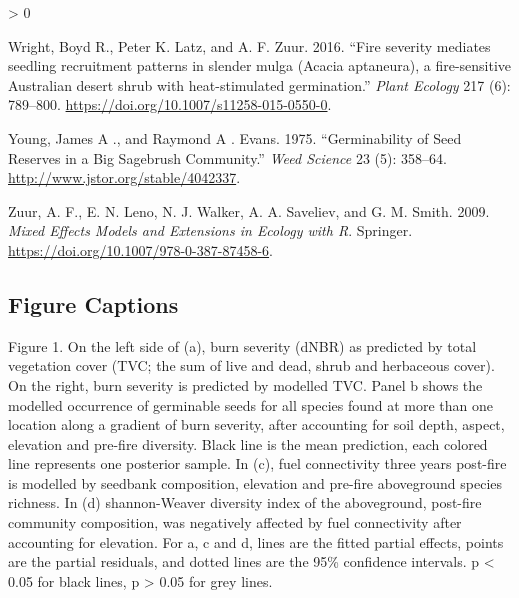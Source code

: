 \documentclass[
  12pt,
]{article}
\newlength{\cslhangindent}
\newenvironment{CSLReferences}[2] %
 {%
  \setlength{\parindent}{0pt}
  \ifodd #1 \everypar{\setlength{\hangindent}{\cslhangindent}}\ignorespaces\fi
  \ifnum #2 > 0
  \setlength{\parskip}{#2\baselineskip}
  \fi
 }%
 {}
\begin{document}
\begin{CSLReferences}{1}{0}
\leavevmode\hypertarget{ref-Wright2016}{}%
Wright, Boyd R., Peter K. Latz, and A. F. Zuur. 2016. {``{Fire severity
mediates seedling recruitment patterns in slender mulga (Acacia
aptaneura), a fire-sensitive Australian desert shrub with
heat-stimulated germination}.''} \emph{Plant Ecology} 217 (6): 789--800.
\url{https://doi.org/10.1007/s11258-015-0550-0}.

\leavevmode\hypertarget{ref-Young1975}{}%
Young, James A ., and Raymond A . Evans. 1975. {``{Germinability of Seed
Reserves in a Big Sagebrush Community}.''} \emph{Weed Science} 23 (5):
358--64. \url{http://www.jstor.org/stable/4042337}.

\leavevmode\hypertarget{ref-Zuur2009}{}%
Zuur, A. F., E. N. Leno, N. J. Walker, A. A. Saveliev, and G. M. Smith.
2009. \emph{{Mixed Effects Models and Extensions in Ecology with R}}.
Springer. \url{https://doi.org/10.1007/978-0-387-87458-6}.

\end{CSLReferences}

\newpage

\hypertarget{figure-captions}{%
\subsection{Figure Captions}\label{figure-captions}}

Figure 1. On the left side of (a), burn severity (dNBR) as predicted by
total vegetation cover (TVC; the sum of live and dead, shrub and
herbaceous cover). On the right, burn severity is predicted by modelled
TVC. Panel b shows the modelled occurrence of germinable seeds for all
species found at more than one location along a gradient of burn
severity, after accounting for soil depth, aspect, elevation and
pre-fire diversity. Black line is the mean prediction, each colored line
represents one posterior sample. In (c), fuel connectivity three years
post-fire is modelled by seedbank composition, elevation and pre-fire
aboveground species richness. In (d) shannon-Weaver diversity index of
the aboveground, post-fire community composition, was negatively
affected by fuel connectivity after accounting for elevation. For a, c
and d, lines are the fitted partial effects, points are the partial
residuals, and dotted lines are the 95\% confidence intervals. p
\textless{} 0.05 for black lines, p \textgreater{} 0.05 for grey lines.

\newpage
\end{document}

